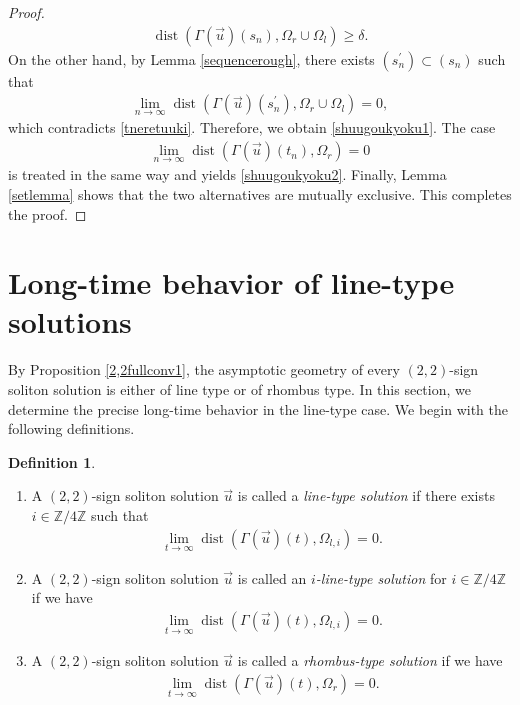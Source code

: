 \documentclass[reqno]{amsart}
\theoremstyle{plain}
\theoremstyle{definition}
\newtheorem{definition}{Definition}[section]
\numberwithin{equation}{section}
\begin{document}
\begin{proof}
\begin{align}\label{tneretuuki}
\operatorname{dist}\left(\Gamma(\vec{u})(s_n),\Omega_r\cup \Omega_l\right)\geq \delta.
\end{align}
On the other hand, by Lemma \ref{sequencerough}, there exists $(s_n^{\prime})\subset (s_n)$ such that 
\begin{align*}
\lim_{n\to\infty}\operatorname{dist}\left(\Gamma(\vec{u})(s_n^{\prime}),\Omega_r\cup \Omega_l\right)=0,
\end{align*}
which contradicts \eqref{tneretuuki}. Therefore, we obtain \eqref{shuugoukyoku1}. The case
\begin{align*}
\lim_{n\to\infty}\operatorname{dist}\left(\Gamma(\vec{u})(t_n),\Omega_r\right)=0
\end{align*}
is treated in the same way and yields \eqref{shuugoukyoku2}. Finally, Lemma \ref{setlemma} shows that the two alternatives are mutually exclusive. This completes the proof.
\end{proof}


\section{Long-time behavior of line-type solutions}

By Proposition \ref{2,2fullconv1}, the asymptotic geometry of every $(2,2)$-sign soliton solution is either of line type or
of rhombus type. In this section, we determine the precise long-time behavior in the line-type case. We begin with the
following definitions.

\begin{definition}\label{typedef}
\begin{enumerate}
\item A $(2,2)$-sign soliton solution $\vec{u}$ is called a \textit{line-type solution} if there exists $i\in \mathbb{Z}/4\mathbb{Z}$ such that 
\begin{align}\label{linetypedefes}
\lim_{t\to\infty}\operatorname{dist}(\Gamma(\vec{u})(t),\Omega_{l,i})=0.
\end{align}

\item A $(2,2)$-sign soliton solution $\vec{u}$ is called an \textit{$i$-line-type solution} for $i\in\mathbb{Z}/4\mathbb{Z}$ if we have
\begin{align}\label{i-typedefes}
\lim_{t\to\infty}\operatorname{dist}(\Gamma(\vec{u})(t),\Omega_{l,i})=0.
\end{align}

\item A $(2,2)$-sign soliton solution $\vec{u}$ is called a \textit{rhombus-type solution} if we have
\begin{align}\label{hishidefes}
\lim_{t\to\infty}\operatorname{dist}(\Gamma(\vec{u})(t),\Omega_r)=0.
\end{align}
\end{enumerate}
\end{definition}
\end{document}
